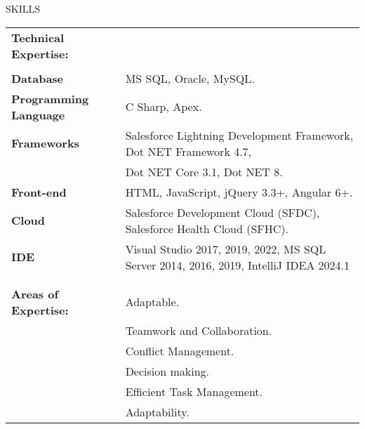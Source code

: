 \documentclass[11pt]{resume}
\begin{document}
    \begin{rSection}{SKILLS}

        \begin{tabular}{ @{} >{\bfseries}l @{\hspace{6ex}} l }
            \textbf{Technical Expertise:}\\\\
            \textbf{Database} & MS SQL, Oracle, MySQL.\\
            \textbf{Programming Language} & C Sharp, Apex.\\
            \textbf{Frameworks} &   Salesforce Lightning Development Framework,  Dot NET Framework 4.7,\\
            &   Dot NET Core 3.1, Dot NET 8.\\
            \textbf{Front-end} &    HTML, JavaScript, jQuery 3.3+, Angular 6+.\\
            \textbf{Cloud} &    Salesforce Development Cloud (SFDC), Salesforce Health Cloud (SFHC).\\
            \textbf{IDE} &  Visual Studio 2017, 2019, 2022, MS SQL Server 2014, 2016, 2019, IntelliJ IDEA 2024.1\\
            \\\\
            \textbf{Areas of Expertise:}    &    Adaptable.\\
            &    Teamwork and Collaboration.\\
            &    Conflict Management.\\
            &    Decision making.\\
            &    Efficient Task Management.\\
            &    Adaptability.\\
        \end{tabular}\\
    \end{rSection}
\end{document}

